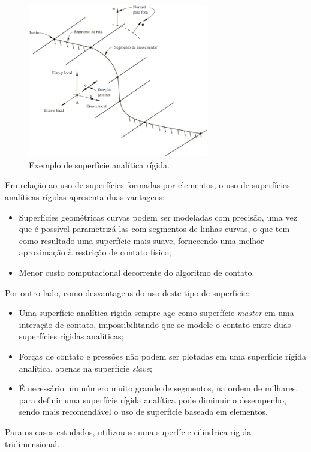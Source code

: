 \begin{figure}[!ht]
    \centering
    \caption{Exemplo de superfície analítica rígida.}\label{fig:superficie_analitica}
    \includegraphics[width=0.7\textwidth]{imagens/superficie_analitica}
\end{figure}

Em relação ao uso de superfícies formadas por elementos, o uso de superfícies analíticas rígidas apresenta duas vantagens:
\begin{itemize}
    \item Superfícies geométricas curvas podem ser modeladas com precisão, uma vez que é possível parametrizá-las com segmentos de linhas curvas, o que tem como resultado uma superfície mais suave, fornecendo uma melhor aproximação à restrição de contato físico;
    \item Menor custo computacional decorrente do algoritmo de contato.
\end{itemize}

Por outro lado, como desvantagens do uso deste tipo de superfície:
\begin{itemize}
    \item Uma superfície analítica rígida sempre age como superfície \textit{master} em uma interação de contato, impossibilitando que se modele o contato entre duas superfícies rígidas analíticas;
    \item Forças de contato e pressões não podem ser plotadas em uma superfície rígida analítica, apenas na superfície \textit{slave};
    \item É necessário um número muito grande de segmentos, na ordem de milhares, para definir uma superfície rígida analítica pode diminuir o desempenho, sendo mais recomendável o uso de superfície baseada em elementos.
\end{itemize}


Para os casos estudados, utilizou-se uma superfície cilíndrica rígida tridimensional.
